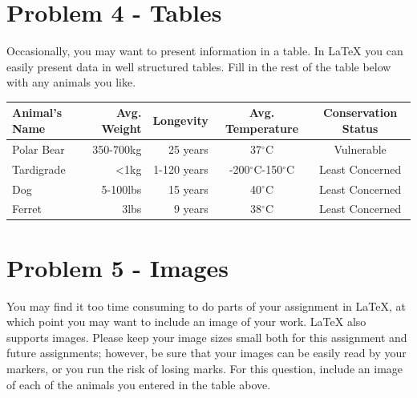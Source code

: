 \documentclass[12pt]{article}
\begin{document}
\section*{Problem 4 - Tables}
Occasionally, you may want to present information in a table. In \LaTeX{} you can easily
 present data in well structured tables.
Fill in the rest of the table below with any animals you like.\\


\begin{tabular}{ | l || r  | r | c | c |} \hline
  Animal's Name & Avg. Weight & Longevity & Avg. Temperature & Conservation Status  \\ \hline
   Polar Bear & 350-700kg & 25 years & 37$^{\circ}$C  & Vulnerable \\ \hline
   Tardigrade & \textless 1kg & 1-120 years & -200$^{\circ}$C-150$^{\circ}$C & Least Concerned\\ \hline
    Dog & 5-100lbs & 15 years & 40$^{\circ}$C & Least Concerned\\ \hline
    Ferret & 3lbs & 9 years & 38$^{\circ}$C & Least Concerned\\ \hline
\end{tabular}

\section*{Problem 5 - Images}
You may find it too time consuming to do parts of your assignment in \LaTeX{}, at which
point you may want to include an image of your work. \LaTeX{} also supports images.
Please keep your image sizes small both for this assignment and future assignments;
however, be sure that your images can be easily read by your markers, or you run the
risk of losing marks. For this question, include an image of each of the animals you
entered in the table above.\\

\end{document}
